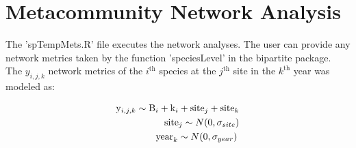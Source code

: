 \documentclass{article}\usepackage[]{graphicx}\usepackage[]{color}
\begin{document}
\section{Metacommunity Network Analysis}

The 'spTempMets.R' file executes the network analyses. The  user can
provide any network metrics taken by the function 'speciesLevel' in
the bipartite package. The  $y_{i,j,k}$ network
metrics of the $i^{\mathrm{th}}$ species at the $j^{\mathrm{th}}$ site
in the $k^{\mathrm{th}}$ year was modeled as:

%
\begin{equation}
\label{eq:lms}
\begin{split}
\mathrm{y}_{i,j,k} \sim \mathrm{B}_{i} + \mathrm{k}_{i} +
\mathrm{site}_{j} + \mathrm{site}_{k} \\   
\mathrm{site}_{j} \sim N(0, \sigma_{site}) \\  
\mathrm{year}_{k} \sim N(0, \sigma_{year})
\hspace{0.2em}
\end{split}
\end{equation}
%
\end{document}
